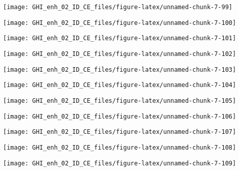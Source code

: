 \documentclass[
  10pt,
  a4paper,oneside]{article}
\begin{document}
\begin{center}\texttt{[image: GHI\_enh\_02\_ID\_CE\_files/figure-latex/unnamed-chunk-7-99]} \end{center}

\begin{center}\texttt{[image: GHI\_enh\_02\_ID\_CE\_files/figure-latex/unnamed-chunk-7-100]} \end{center}

\begin{center}\texttt{[image: GHI\_enh\_02\_ID\_CE\_files/figure-latex/unnamed-chunk-7-101]} \end{center}

\begin{center}\texttt{[image: GHI\_enh\_02\_ID\_CE\_files/figure-latex/unnamed-chunk-7-102]} \end{center}

\begin{center}\texttt{[image: GHI\_enh\_02\_ID\_CE\_files/figure-latex/unnamed-chunk-7-103]} \end{center}

\begin{center}\texttt{[image: GHI\_enh\_02\_ID\_CE\_files/figure-latex/unnamed-chunk-7-104]} \end{center}

\begin{center}\texttt{[image: GHI\_enh\_02\_ID\_CE\_files/figure-latex/unnamed-chunk-7-105]} \end{center}

\begin{center}\texttt{[image: GHI\_enh\_02\_ID\_CE\_files/figure-latex/unnamed-chunk-7-106]} \end{center}

\begin{center}\texttt{[image: GHI\_enh\_02\_ID\_CE\_files/figure-latex/unnamed-chunk-7-107]} \end{center}

\begin{center}\texttt{[image: GHI\_enh\_02\_ID\_CE\_files/figure-latex/unnamed-chunk-7-108]} \end{center}

\begin{center}\texttt{[image: GHI\_enh\_02\_ID\_CE\_files/figure-latex/unnamed-chunk-7-109]} \end{center}
\end{document}

